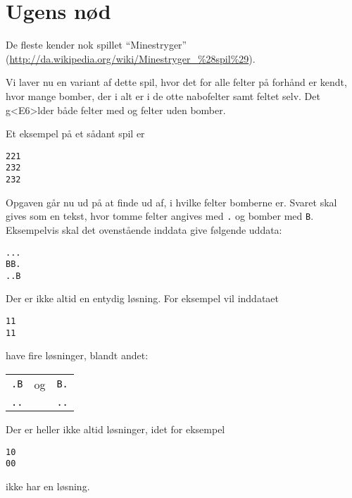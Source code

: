 \documentclass[a4paper,12pt]{article}
\begin{document}
\newpage
\section{Ugens nød}
\label{sec:ugens-nod}
De fleste kender nok spillet "`Minestryger"'
(\url{http://da.wikipedia.org/wiki/Minestryger_%28spil%29}).

  Vi laver nu en variant af dette spil, hvor det for alle felter på
  forhånd er kendt, hvor mange bomber, der i alt er i de otte
  nabofelter samt feltet selv.  Det g<E6>lder både felter med og felter
  uden bomber.

  Et eksempel på et sådant spil er

\begin{verbatim}
221
232
232
\end{verbatim}
  
  Opgaven går nu ud på at finde ud af, i hvilke felter bomberne er.
  Svaret skal gives som en tekst, hvor tomme felter angives med
  \texttt{.} og bomber med \texttt{B}.  Eksempelvis skal det
  ovenstående inddata give følgende uddata:

\begin{verbatim}
...
BB.
..B
\end{verbatim}
  
Der er ikke altid en entydig løsning.  For eksempel vil inddataet


\begin{verbatim}
11
11
\end{verbatim}
 
have fire løsninger, blandt andet:

\vspace{1ex}

\noindent
\begin{tabular}{lcl}
\texttt{.B} & og & \texttt{B.} \\
\texttt{..} &  & \texttt{..}
\end{tabular}
\vspace{1ex}

Der er heller ikke altid løsninger, idet for eksempel

\begin{verbatim}
10
00
\end{verbatim}
 
ikke har en løsning.
\end{document}
